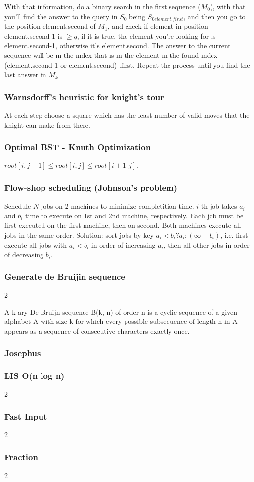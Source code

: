 \documentclass[a4paper,12pt]{article}
\newcommand\includefile[4]{
  \subsubsection{#2}
  \begin{multicols}{2}
    
  \end{multicols}
}
\begin{document}
With that information, do a binary search in the first sequence ($M_{0}$), with that you'll find the answer to the query in $S_{0}$ being $S_{0{element.first}}$, and then you go to the position element.second of $M_{1}$, and check if element in position element.second-1 is $\geq q$, if it is true, the element you're looking for is element.second-1, otherwise it's element.second. The answer to the current sequence will be in the index that is in the element in the found index (element.second-1 or element.second) .first. Repeat the process until you find the last answer in $M_{k}$

\subsubsection{Warnsdorff’s heuristic for knight’s tour}
At each step choose a square which has the least number of valid moves that the knight can make from there.

\subsubsection{Optimal BST - Knuth Optimization}
$root[i, j - 1] \leq root[i, j] \leq root[i + 1, j]$.

\subsubsection{Flow-shop scheduling (Johnson’s problem)}
Schedule $N$ jobs on 2 machines to minimize completition time. $i$-th job takes $a_i$ and $b_i$ time to execute on 1st and 2nd machine, respectively.
Each job must be first executed on the first machine, then on second. Both machines execute all jobs in the same order. Solution: sort jobs by key $a_i < b_i ? a_i : (\infty - b_i)$,
i.e. first execute all jobs with $a_i < b_i$ in order of increasing $a_i$, then all other jobs in order of decreasing $b_i$.

\includefile{c++}{Generate de Bruijin sequence}{misc}{debruijn.cpp}
A k-ary De Bruijn sequence B(k, n) of order n is a cyclic sequence of a given alphabet A with size k for which every possible subsequence of length n in A appears as a sequence of consecutive characters exactly once.

\subsubsection{Josephus}


\includefile{c++}{LIS O(n log n)}{misc}{lis.cpp}
\includefile{c++}{Fast Input}{misc}{fast_input.cpp}
\includefile{c++}{Fraction}{misc}{fraction.cpp}
\end{document}

